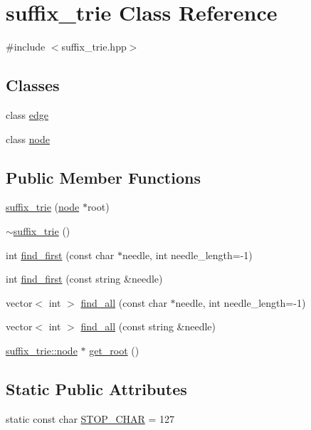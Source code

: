 \hypertarget{classsuffix__trie}{\section{suffix\+\_\+trie Class Reference}
\label{classsuffix__trie}
}


{\ttfamily \#include $<$suffix\+\_\+trie.\+hpp$>$}

\subsection*{Classes}
\begin{DoxyCompactItemize}
\item 
class \hyperlink{classsuffix__trie_1_1edge}{edge}
\item 
class \hyperlink{classsuffix__trie_1_1node}{node}
\end{DoxyCompactItemize}
\subsection*{Public Member Functions}
\begin{DoxyCompactItemize}
\item 
\hyperlink{classsuffix__trie_a9abcb4670f7a77310cb99b9bcf793d96}{suffix\+\_\+trie} (\hyperlink{classsuffix__trie_1_1node}{node} $\ast$root)
\item 
\hyperlink{classsuffix__trie_ad167499438414cfd39d4348293ce518c}{$\sim$suffix\+\_\+trie} ()
\item 
int \hyperlink{classsuffix__trie_aa0b4eb1f5b48c368bab4e7fa092f3397}{find\+\_\+first} (const char $\ast$needle, int needle\+\_\+length=-\/1)
\item 
int \hyperlink{classsuffix__trie_ace4532672b5494b16ca6a61ece4253bb}{find\+\_\+first} (const string \&needle)
\item 
vector$<$ int $>$ \hyperlink{classsuffix__trie_ab362340e269e59692d4fabe133d15a6c}{find\+\_\+all} (const char $\ast$needle, int needle\+\_\+length=-\/1)
\item 
vector$<$ int $>$ \hyperlink{classsuffix__trie_a389b5a98d9de10c0ff9fbd2e2ae7b117}{find\+\_\+all} (const string \&needle)
\item 
\hyperlink{classsuffix__trie_1_1node}{suffix\+\_\+trie\+::node} $\ast$ \hyperlink{classsuffix__trie_aaac718aa91f18353d139d1af068e132b}{get\+\_\+root} ()
\end{DoxyCompactItemize}
\subsection*{Static Public Attributes}
\begin{DoxyCompactItemize}
\item 
static const char \hyperlink{classsuffix__trie_a65563ea1279d3fc3353a0806f6a07aad}{S\+T\+O\+P\+\_\+\+C\+H\+A\+R} = 127
\end{DoxyCompactItemize}
